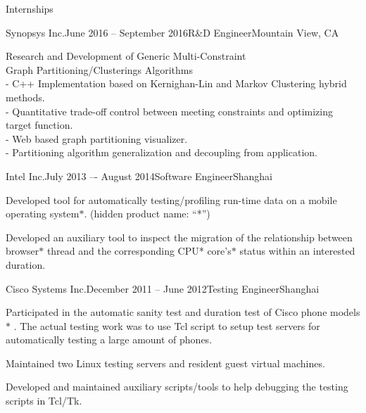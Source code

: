 \documentclass{resume} %
\begin{document}

\begin{rSection}{Internships}

    \begin{rSubsection}{Synopsys Inc.}{June 2016 -- September 2016}{R\&D Engineer}{Mountain View, CA}

    \item Research and Development of Generic Multi-Constraint\\Graph Partitioning/Clusterings Algorithms
     \\- C++ Implementation based on Kernighan-Lin and Markov Clustering hybrid methods.
     \\- Quantitative trade-off control between meeting constraints and optimizing target function.
     \\- Web based graph partitioning visualizer.
     \\- Partitioning algorithm generalization and decoupling from application.
    \end{rSubsection}

    \begin{rSubsection}{Intel Inc.}{July 2013 –- August 2014}{Software Engineer}{Shanghai}

    \item Developed tool for automatically testing/profiling run-time data on a
        mobile operating system$*$. (hidden product name: ``*'')

    \item Developed an auxiliary tool to inspect the migration of the
        relationship between browser$*$ thread and the corresponding CPU*
        core's$*$ status within an interested duration.

    \end{rSubsection}

    \begin{rSubsection}{Cisco Systems Inc.}{December 2011 -- June 2012}{Testing Engineer}{Shanghai}

    \item Participated in the automatic sanity test and duration test of Cisco
        phone models$*$ . The actual testing work was to use Tcl script to
        setup test servers for automatically testing a large amount of phones.

    \item Maintained two Linux testing servers and resident guest virtual
        machines.

    \item Developed and maintained auxiliary scripts/tools to help debugging
        the testing scripts in Tcl/Tk.

    \end{rSubsection}

\end{rSection}
\end{document}
